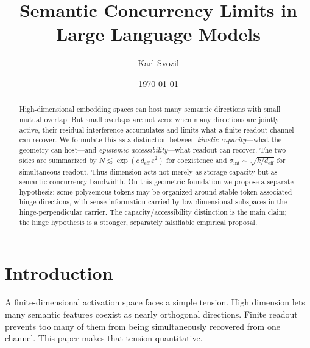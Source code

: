 \documentclass[
  aps,
  reprint,
  superscriptaddress,
  floatfix,
  nofootinbib,
  longbibliography
]{revtex4-2}
\newcommand{\deff}{d_{\mathrm{eff}}}
\newcommand{\sint}{\sigma_{\mathrm{int}}}
\begin{document}
\title{Semantic Concurrency Limits in Large Language Models}

\author{Karl Svozil}

\date{\today}

\begin{abstract}
High-dimensional embedding spaces can host many semantic directions
with small mutual overlap. But small overlaps are not zero: when many
directions are jointly active, their residual interference accumulates
and limits what a finite readout channel can recover. We formulate this
as a distinction between \emph{kinetic capacity}---what the geometry
can host---and \emph{epistemic accessibility}---what readout can
recover. The two sides are summarized by
$N\lesssim\exp(c\,\deff\,\varepsilon^{2})$ for coexistence and
$\sint\sim\sqrt{k/\deff}$ for simultaneous readout. Thus dimension acts
not merely as storage capacity but as semantic concurrency bandwidth.
On this geometric foundation we propose a separate hypothesis: some
polysemous tokens may be organized around stable token-associated
hinge directions, with sense information carried by low-dimensional
subspaces in the hinge-perpendicular carrier. The capacity/accessibility
distinction is the main claim; the hinge hypothesis is a stronger,
separately falsifiable empirical proposal.
\end{abstract}

\maketitle

\section{Introduction}
\label{sec:intro}

A finite-dimensional activation space faces a simple tension. High
dimension lets many semantic features coexist as nearly orthogonal
directions. Finite readout prevents too many of them from being
simultaneously recovered from one channel. This paper makes that
tension quantitative.
\end{document}
